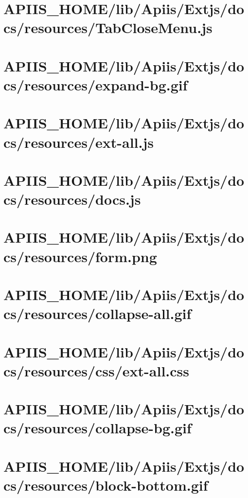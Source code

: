 \section{APIIS\_HOME/lib/Apiis/Extjs/docs/resources/TabCloseMenu.js} 
\section{APIIS\_HOME/lib/Apiis/Extjs/docs/resources/expand-bg.gif} 
\section{APIIS\_HOME/lib/Apiis/Extjs/docs/resources/ext-all.js} 
\section{APIIS\_HOME/lib/Apiis/Extjs/docs/resources/docs.js} 
\section{APIIS\_HOME/lib/Apiis/Extjs/docs/resources/form.png} 
\section{APIIS\_HOME/lib/Apiis/Extjs/docs/resources/collapse-all.gif} 
\section{APIIS\_HOME/lib/Apiis/Extjs/docs/resources/css/ext-all.css} 
\section{APIIS\_HOME/lib/Apiis/Extjs/docs/resources/collapse-bg.gif} 
\section{APIIS\_HOME/lib/Apiis/Extjs/docs/resources/block-bottom.gif} 
